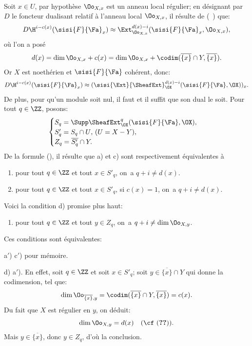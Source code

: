 Soit $x\in U$, par hypoth\`ese $\Oo_{X, x}$ est un anneau local r\'egulier; en d\'esignant par $D$ le foncteur dualisant relatif \`a l'anneau local $\Oo_{X, x}$, il r\'esulte de (~) que:
\[D\H^{i-c(x)}(\sisi{F}{{\Fa}}_x)\approx \Ext^{d(x)-i}_{\Oo_{X, x}}(\sisi{F}{{\Fa}}_x, \Oo_{X, x}), \]
o\`u l'on a pos\'e
\begin{equation} \label{eq:VIII.2.2} d(x)=\dim \Oo_{X, x} + c(x) = \dim \Oo_{X, x}+\codim(\overline{\{x\}}\cap Y, \overline{\{x\}}).
\end{equation}
Or $X$ est noeth\'erien et $\sisi{F}{{\Fa}}$ coh\'erent, donc:
\begin{equation} \label{eq:VIII.2.3} D\H^{i-c(x)}(\sisi{F}{{\Fa}}_x)\approx (\sisi{\Ext}{\SheafExt}^{d(x)-i}_{\OX}(\sisi{F}{{\Fa}}, \OX))_x.
\end{equation}
De plus, pour qu'un module soit nul, il faut et il suffit que son dual le soit. Pour tout $q\in\ZZ$, posons\pageoriginale:
\begin{equation} \label{eq:VIII.2.4}
\begin{cases}
S_q=\Supp \SheafExt^q_{\OX}(\sisi{F}{{\Fa}}, \OX), \\
S'_q=S_q\cap U\text{, (}U=X-Y\text{)}, \\
Z_q=\overline{S'_q}\cap Y.
\end{cases}
\end{equation}
De la formule (), il r\'esulte que a) et c) sont respectivement \'equivalentes \`a
\begin{enumerate}
\item[a$'$)]
pour tout $q\in\ZZ$ et tout $x\in S'_q$, on~a $q+i\neq d(x)$.

\item[c$'$)]
pour tout $q\in\ZZ$ et tout $x\in S'_q$, si $c(x)=1$, on~a $q+i\neq d(x)$.
\end{enumerate}
\noindent Voici la condition d) promise plus haut:
\begin{enumerate}
\item[d)]
pour tout $q\in \ZZ$ et tout $y\in Z_q$, on~a $q+i\neq \dim \Oo_{X, y}$.
\end{enumerate}
\noindent Ces conditions sont \'equivalentes:

a$'$) \ALORS c$'$) pour m\'emoire.

d) \ALORS a$'$). En effet, soit $q\in \ZZ$ et soit $x\in S'_q$; soit $y\in\overline{\{x\}}\cap Y$ qui \og donne la codimension\fg, \ie tel que:
\begin{equation} \label{eq:VIII.2.5} \dim \Oo_{\overline{\{x\}}, y}=\codim(\overline{\{x\}}\cap Y, \overline{\{x\}})=c(x).
\end{equation}
Du fait que $X$ est r\'egulier en $y$, on d\'eduit:
\begin{equation} \label{eq:VIII.2.6} \dim \Oo_{X, y}=d(x)\quad \text{(\cf (\Ref{eq:VIII.2.2})).}
\end{equation}
Mais $y\in\overline{\{x\}}$, donc $y\in Z_q$, d'o\`u la conclusion.

